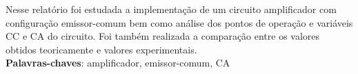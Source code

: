 \setlength{\absparsep}{18pt} %
 \begin{resumo}
Nesse relatório foi estudada a implementação de um circuito amplificador com configuração emissor-comum bem como análise dos pontos de operação e variáveis CC e CA do circuito. Foi também realizada a comparação entre os valores obtidos teoricamente e valores experimentais.\\
 \noindent
 \textbf{Palavras-chaves}: amplificador, emissor-comum, CA
\end{resumo} 